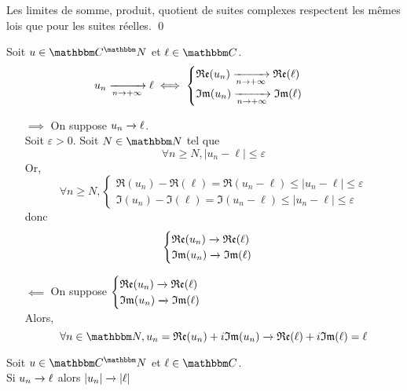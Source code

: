 \begin{prop}
	Les limites de somme, produit, quotient de suites complexes respectent les mêmes lois que pour les suites réelles.
	\qed
\end{prop}

\begin{thm}
	Soit $u \in \C^\N$ et $\ell\in \C$. \[
	u_n \tendsto{n \to +\infty} \ell
	\iff
	\begin{cases}
		\Re(u_n) \tendsto{n \to  +\infty} \Re(\ell)\\
		\Im(u_n) \tendsto{n \to  +\infty} \Im(\ell)\\
	\end{cases}
	\] 
\end{thm}

\begin{prv}
	\begin{itemize}
		\item[$\implies$] On suppose $u_n \xrightarrow[]{} \ell$.\\
			Soit $\varepsilon >0$. Soit $N \in \N$ tel que \[
			\forall  n \ge  N, \left| u_n-\ell \right| \le  \varepsilon
			\] Or, \[
			\forall  n \ge  N, \begin{cases}
				\Re(u_n) - \Re(\ell) = \Re(u_n - \ell) \le \left| u_n-\ell \right| \le \varepsilon\\
				\Im(u_n) - \Im(\ell) = \Im(u_n - \ell) \le \left| u_n-\ell \right| \le \varepsilon
			\end{cases}
			\] donc \[
			\begin{cases}
				\Re(u_n) \tendsto{} \Re(\ell)\\
				\Im(u_n) \tendsto{} \Im(\ell)\\
			\end{cases}
			\] 
		\item[$\impliedby$] On suppose $\begin{cases}
			\Re(u_n) \tendsto{} \Re(\ell)\\
			\Im(u_n) \tendsto{} \Im(\ell)\\
		\end{cases}$\\
		Alors, \[
		\forall n \in \N, u_n = \Re(u_n) + i \Im(u_n) \tendsto{} \Re(\ell) + i\Im(\ell) = \ell
		\] 
	\end{itemize}
\end{prv}

\begin{prop}
	Soit $u \in \C^\N$ et $\ell\in \C$.\\
	Si $u_n \xrightarrow[]{} \ell$ alors $\left| u_n \right| \xrightarrow[]{} \left| \ell \right|$
\end{prop}

